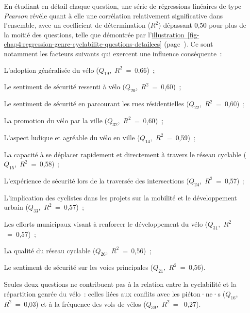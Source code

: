 \begin{refsegment}
En étudiant en détail chaque question, une série de régressions linéaires de type \textsl{Pearson} \textcolor{blue}{\autocite{pearson_vii_1896}} révèle quant à elle une corrélation relativement significative dans l'ensemble, avec un coefficient de détermination ($R^2$) dépassant 0,50 pour plus de la moitié des questions, telle que démontrée par l'\hyperref[fig-chap4:regression-genre-cyclabilite-questions-detailees]{illustration~\ref{fig-chap4:regression-genre-cyclabilite-questions-detailees}} (page~\pageref{fig-chap4:regression-genre-cyclabilite-questions-detailees}). Ce sont notamment les facteurs suivants qui exercent une influence conséquente~:
    \begin{customitemize}
\item L'adoption généralisée du vélo (\(Q_{19}\),~$R^2$~=~0,66)~;
\item Le sentiment de sécurité ressenti à vélo (\(Q_{20}\),~$R^2$~=~0,60)~;
\item Le sentiment de sécurité en parcourant les rues résidentielles (\(Q_{22}\),~$R^2$~=~0,60)~;
\item La promotion du vélo par la ville (\(Q_{32}\),~$R^2$~=~0,60)~;
\item L'aspect ludique et agréable du vélo en ville (\(Q_{14}\),~$R^2$~=~0,59)~;
\item La capacité à se déplacer rapidement et directement à travers le réseau cyclable (\(Q_{15}\),~$R^2$~=~0,58)~;
\item L'expérience de sécurité lors de la traversée des intersections (\(Q_{24}\),~$R^2$~=~0,57)~;
\item L'implication des cyclistes dans les projets sur la mobilité et le développement urbain (\(Q_{33}\),~$R^2$~=~0,57)~;
\item Les efforts municipaux visant à renforcer le développement du vélo (\(Q_{31}\),~$R^2$~=~0,57)~;
\item La qualité du réseau cyclable (\(Q_{26}\),~$R^2$~=~0,56)~;
\item Le sentiment de sécurité sur les voies principales (\(Q_{21}\),~$R^2$~=~0,56).
    \end{customitemize}
Seules deux questions ne contribuent pas à la relation entre la cyclabilité et la répartition genrée du vélo~: celles liées aux conflits avec les piéton·ne·s (\(Q_{16}\),~$R^2$~=~0,03) et à la fréquence des vols de vélos (\(Q_{39}\),~$R^2$~=~-0,27).%


\end{refsegment}
